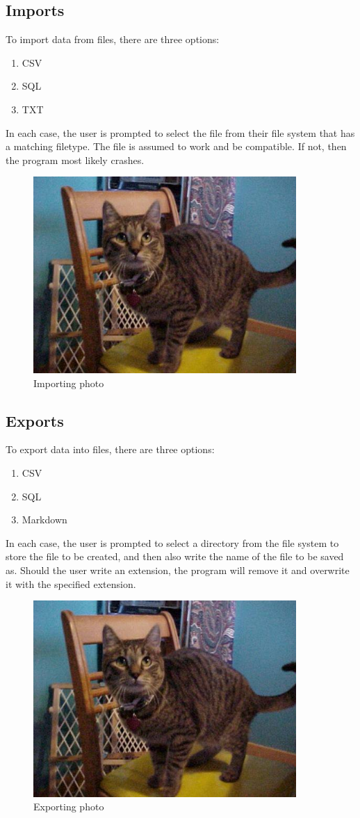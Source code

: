 \subsection{Imports}

To import data from files, there are three options:
\begin{enumerate}
	\item CSV
	\item SQL
	\item TXT
\end{enumerate}

In each case, the user is prompted to select the file from their file
system that has a matching filetype. The file is assumed to work and
be compatible. If not, then the program most likely crashes.

\begin{figure}[htb]
	\centering
	\includegraphics[width=10cm]{./Images/cats_00001.jpg}
	\caption{Importing photo}
	\label{fig:DBOperations}
\end{figure}

\subsection{Exports}

To export data into files, there are three options:
\begin{enumerate}
	\item CSV
	\item SQL
	\item Markdown
\end{enumerate}

In each case, the user is prompted to select a directory from the
file system to store the file to be created, and then also write the
name of the file to be saved as. Should the user write an extension,
the program will remove it and overwrite it with the
specified extension.

\begin{figure}[htb]
	\centering
	\includegraphics[width=10cm]{./Images/cats_00001.jpg}
	\caption{Exporting photo}
	\label{fig:DBOperations}
\end{figure}
